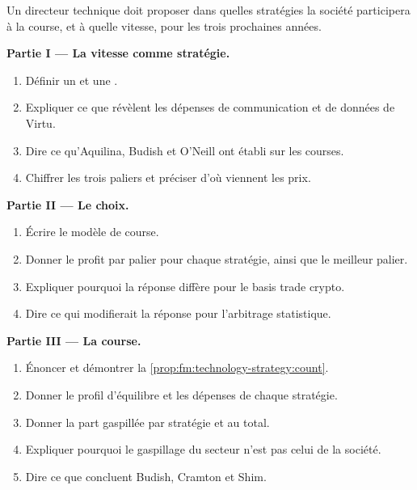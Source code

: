 \begin{problem}\label{pb:fm:technology-strategy:1}
Un directeur technique doit proposer dans quelles stratégies la société participera à la course, et à quelle vitesse, pour les trois prochaines années.

\medskip\noindent\textbf{Partie I --- La vitesse comme stratégie.}
\begin{enumerate}
\item Définir un  et une .
\item Expliquer ce que révèlent les dépenses de communication et de données de Virtu.
\item Dire ce qu'Aquilina, Budish et O'Neill ont établi sur les courses.
\item Chiffrer les trois paliers et préciser d'où viennent les prix.
\end{enumerate}

\medskip\noindent\textbf{Partie II --- Le choix.}
\begin{enumerate}[resume]
\item Écrire le modèle de course.
\item Donner le profit par palier pour chaque stratégie, ainsi que le meilleur palier.
\item Expliquer pourquoi la réponse diffère pour le basis trade crypto.
\item Dire ce qui modifierait la réponse pour l'arbitrage statistique.
\end{enumerate}

\medskip\noindent\textbf{Partie III --- La course.}
\begin{enumerate}[resume]
\item Énoncer et démontrer la \cref{prop:fm:technology-strategy:count}.
\item Donner le profil d'équilibre et les dépenses de chaque stratégie.
\item Donner la part gaspillée par stratégie et au total.
\item Expliquer pourquoi le gaspillage du secteur n'est pas celui de la société.
\item Dire ce que concluent Budish, Cramton et Shim.
\end{enumerate}


\end{problem}
